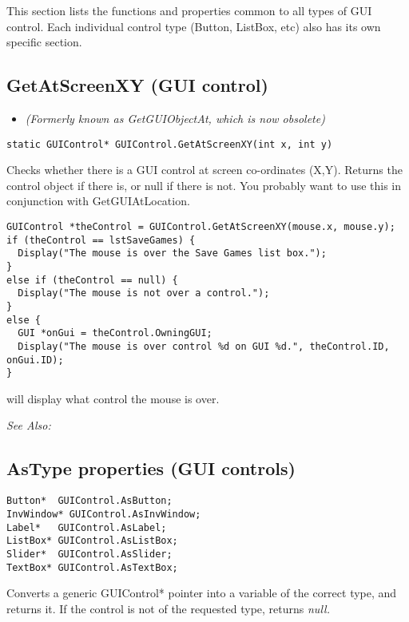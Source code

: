 This section lists the functions and properties common to all types of GUI control.
Each individual control type (Button, ListBox, etc) also has its own specific section.


\subsection{GetAtScreenXY (GUI control)}\label{GUIControl.GetAtScreenXY}%

\begin{itemize}
\item \it{(Formerly known as GetGUIObjectAt, which is now obsolete)}
\end{itemize}

\begin{verbatim}
static GUIControl* GUIControl.GetAtScreenXY(int x, int y)
\end{verbatim}
Checks whether there is a GUI control at screen co-ordinates (X,Y). Returns
the control object if there is, or null if there is not. You probably
want to use this in conjunction with GetGUIAtLocation.

\begin{verbatim}
GUIControl *theControl = GUIControl.GetAtScreenXY(mouse.x, mouse.y);
if (theControl == lstSaveGames) {
  Display("The mouse is over the Save Games list box.");
}
else if (theControl == null) {
  Display("The mouse is not over a control.");
}
else {
  GUI *onGui = theControl.OwningGUI;
  Display("The mouse is over control %d on GUI %d.", theControl.ID, onGui.ID);
}
\end{verbatim}
will display what control the mouse is over.

\it{See Also:} 


\subsection{AsType properties (GUI controls)}\label{GUIControl.AsType}%

\begin{verbatim}
Button*  GUIControl.AsButton;
InvWindow* GUIControl.AsInvWindow;
Label*   GUIControl.AsLabel;
ListBox* GUIControl.AsListBox;
Slider*  GUIControl.AsSlider;
TextBox* GUIControl.AsTextBox;
\end{verbatim}
Converts a generic GUIControl* pointer into a variable of the correct type, and returns
it. If the control is not of the requested type, returns \it{null}.


